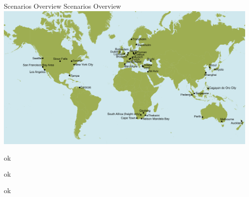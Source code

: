 \createfigure%
{Scenarios Overview}%
{Scenarios Overview}%
{\label{fig:scenarios}}%
{\includegraphics[width=0.99\textwidth, angle=0]{using/figures/MATSimModelsMap}}%
{}

\clearpage
 \clearpage

 \clearpage

 \clearpage

 \clearpage

 \clearpage

 \clearpage

 ok

 ok

 ok

